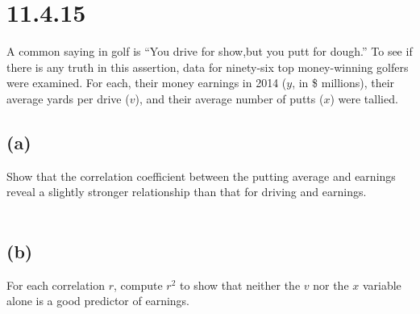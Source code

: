 \documentclass{article}
\begin{document}
{\section*{11.4.15}
A common saying in golf is “You drive for show,but you putt for dough.” To see if there is any truth in this assertion, data for ninety-six top money-winning golfers were examined. For each, their money earnings in 2014 (\(y\), in \$ millions), their average yards per drive (\(v\)), and their average number of putts (\(x\)) were tallied.

\subsection*{(a)} 
Show that the correlation coefficient between the
putting average and earnings reveal a slightly stronger relationship than that for driving and earnings.
\\
\\


\subsection*{(b)} 
For each correlation \(r\), compute \(r^2\) to show that neither the \(v\) nor the \(x\) variable alone is a good predictor of earnings.
\\
\\


}
\end{document}
